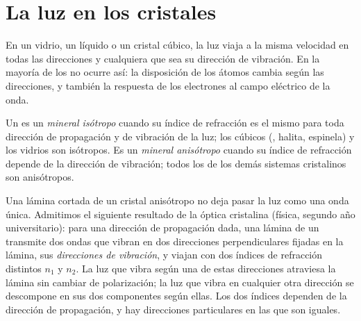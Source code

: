 \section{La luz en los cristales}

En un vidrio, un líquido o un cristal cúbico, la luz viaja a la misma velocidad en todas las direcciones y
cualquiera que sea su dirección de vibración. En la mayoría de los  no ocurre así: la disposición de
los átomos cambia según las direcciones, y también la respuesta de los electrones al campo eléctrico de la onda.

\begin{definition}\label{def:b1:optical-mineralogy:anisotropic}
Un  es un \emph{mineral isótropo} cuando su índice de refracción es el mismo para
toda dirección de propagación y de vibración de la luz; los  cúbicos (, halita, espinela) y los
vidrios son isótropos. Es un \emph{mineral anisótropo} cuando su índice de refracción
depende de la dirección de vibración; todos los  de los demás sistemas cristalinos son anisótropos.
\end{definition}

Una lámina cortada de un cristal anisótropo no deja pasar la luz como una onda única. Admitimos el siguiente
resultado de la óptica cristalina (física, segundo año universitario): para una dirección de propagación dada,
una lámina de un  transmite dos ondas que vibran en dos direcciones perpendiculares fijadas en
la lámina, sus \emph{direcciones de vibración}, y viajan con dos índices de refracción distintos $n_1$ y $n_2$. La
luz que vibra según una de estas direcciones atraviesa la lámina sin cambiar de polarización; la luz que vibra en
cualquier otra dirección se descompone en sus dos componentes según ellas. Los dos índices dependen de la dirección
de propagación, y hay direcciones particulares en las que son iguales.

